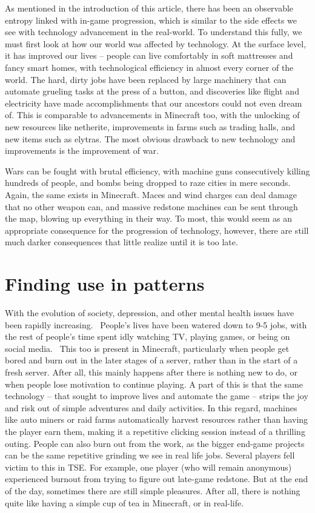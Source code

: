 As mentioned in the introduction of this article, there has been an observable entropy linked with in-game progression, which is similar to the side effects we see with technology advancement in the real-world. To understand this fully, we must first look at how our world was affected by technology. At the surface level, it has improved our lives – people can live comfortably in soft mattresses and fancy smart homes, with technological efficiency in almost every corner of the world. The hard, dirty jobs have been replaced by large machinery that can automate grueling tasks at the press of a button, and discoveries like flight and electricity have made accomplishments that our ancestors could not even dream of. This is comparable to advancements in Minecraft too, with the unlocking of new resources like netherite, improvements in farms such as trading halls, and new items such as elytras. The most obvious drawback to new technology and improvements is the improvement of war.

Wars can be fought with brutal efficiency, with machine guns consecutively killing hundreds of people, and bombs being dropped to raze cities in mere seconds. Again, the same exists in Minecraft. Maces and wind charges can deal damage that no other weapon can, and massive redstone machines can be sent through the map, blowing up everything in their way. To most, this would seem as an appropriate consequence for the progression of technology, however, there are still much darker consequences that little realize until it is too late.

\section{Finding use in patterns}
With the evolution of society, depression, and other mental health issues have been rapidly increasing.~\citep{Hidaka(2012)} People’s lives have been watered down to 9-5 jobs, with the rest of people’s time spent idly watching TV, playing games, or being on social media.~\citep{Malinsky(2026)} This too is present in Minecraft, particularly when people get bored and burn out in the later stages of a server, rather than in the start of a fresh server. After all, this mainly happens after there is nothing new to do, or when people lose motivation to continue playing. A part of this is that the same technology -- that sought to improve lives and automate the game -- strips the joy and risk out of simple adventures and daily activities. In this regard, machines like auto miners or raid farms automatically harvest resources rather than having the player earn them, making it a repetitive clicking session instead of a thrilling outing. People can also burn out from the work, as the bigger end-game projects can be the same repetitive grinding we see in real life jobs. Several players fell victim to this in TSE. For example, one player (who will remain anonymous) experienced burnout from trying to figure out late-game redstone. But at the end of the day, sometimes there are still simple pleasures. After all, there is nothing quite like having a simple cup of tea in Minecraft, or in real-life.

